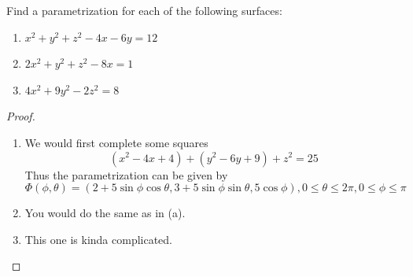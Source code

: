\documentclass[openany]{book}
\begin{document}
\begin{prob}[7]
Find a parametrization for each of the following surfaces:

\begin{enumerate}
    \item[(a)] \( x^2 + y^2 + z^2 - 4x - 6y = 12 \)
    \item[(b)] \( 2x^2 + y^2 + z^2 - 8x = 1 \)
    \item[(c)] \( 4x^2 + 9y^2 - 2z^2 = 8 \)
\end{enumerate}
\end{prob}
\begin{proof}
    \begin{enumerate}
        \item[(a)] We would first complete some squares 
        \begin{equation*}
            (x^2-4x+4)+(y^2-6y+9)+z^2=25
        \end{equation*}
        Thus the parametrization can be given by 
        \begin{equation*}
            \Phi(\phi,\theta)=(2+5\sin\phi\cos\theta, 3+5\sin\phi\sin\theta, 5\cos\phi), 0\leq\theta\leq 2\pi, 0\leq\phi\leq\pi
        \end{equation*}
        \item[(b)] You would do the same as in (a).
        \item[(c)] This one is kinda complicated. 
    \end{enumerate}
\end{proof}
\end{document}
